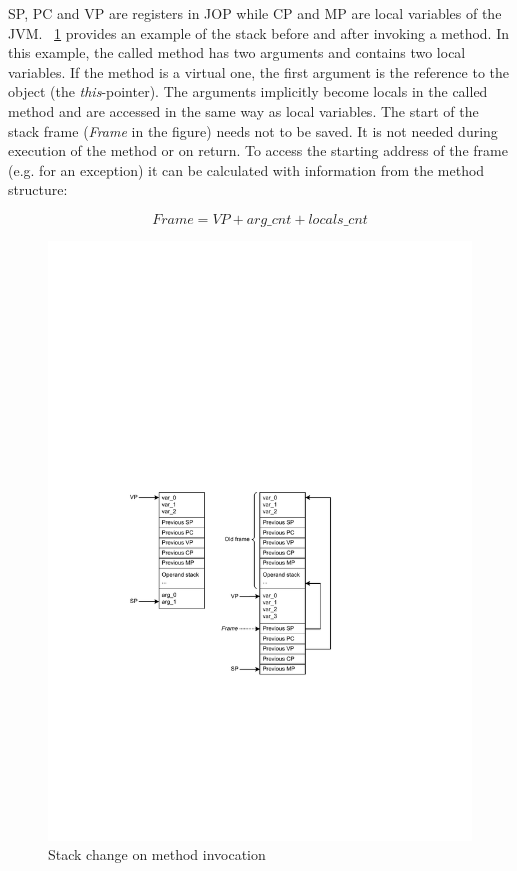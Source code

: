 SP, PC and VP are registers in JOP while CP and MP are local
variables of the JVM. \figurename~\ref{fig_jvm_stack_invoke} provides
an example of the stack before and after invoking a method. In this
example, the called method has two arguments and contains two local
variables. If the method is a virtual one, the first argument is the
reference to the object (the \emph{this}-pointer). The arguments
implicitly become locals in the called method and are accessed in the
same way as local variables. The start of the stack frame
(\emph{Frame} in the figure) needs not to be saved. It is not needed
during execution of the method or on return. To access the starting
address of the frame (e.g. for an exception) it can be calculated
with information from the method structure:

\[Frame = VP + arg\_cnt + locals\_cnt\]

\begin{figure}
    \centering
    \includegraphics[scale=\picscale]{jvm/jvm_stack_invocation}
    \caption{Stack change on method invocation}
    \label{fig_jvm_stack_invoke}
\end{figure}

